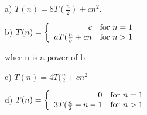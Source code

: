 \documentclass[a4paper]{article}
\begin{document}
\vspace{4mm}
a) $T(n)= 8T(\frac{n}{2}) + cn^2.$

\vspace{8mm}
b) $T(n)=\left \{\begin{array}{rr}
c  & {\rm for }\ n=1 \\
aT({n\over b}+cn  & {\rm for}\ n>1
\end{array} \right.$

\vspace{8mm}
wher n is a power of b

\vspace{3mm}
c) $T(n)= 4T(\frac{n}{2}+cn^2$

\vspace{8mm}
d)  $T(n)=\left \{\begin{array}{rr}
0 & {\rm for }\ n=1 \\
3T({n\over 2}+n-1  & {\rm for}\ n>1
\end{array} \right.$\\
\end{document}
